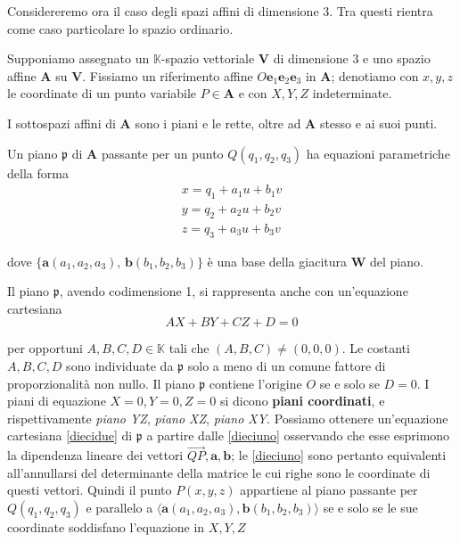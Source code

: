 \documentclass{article}
\theoremstyle{plain}
\theoremstyle{definition}
\theoremstyle{remark}
\begin{document}
Considereremo ora il caso degli spazi affini di dimensione $3$. 
Tra questi rientra come caso particolare lo spazio ordinario.

Supponiamo assegnato un \( \mathbb{K} \)-spazio vettoriale \( \mathbf{V} \) di dimensione $3$ e uno spazio affine \( \mathbf{A} \) su \( \mathbf{V} \). 
Fissiamo un riferimento affine \( O\mathbf{e}_1\mathbf{e}_2\mathbf{e}_3 \) in \( \mathbf{A} \); denotiamo con \( x, y, z \) le coordinate di un punto variabile 
\( P \in \mathbf{A} \) e con \( X, Y, Z \) indeterminate.

I sottospazi affini di \( \mathbf{A} \) sono i piani e le rette, oltre ad \( \mathbf{A} \) stesso e ai suoi punti.

Un piano \( \mathfrak{p} \) di \( \mathbf{A} \) passante per un punto \( Q(q_1, q_2, q_3) \) ha equazioni parametriche della forma
\begin{equation}
\begin{matrix}\label{dieciuno}
x = q_1 + a_1 u + b_1 v \\
y = q_2 + a_2 u + b_2 v \\
z = q_3 + a_3 u + b_3 v
\end{matrix}
\end{equation}

dove \( \{ \mathbf{a}(a_1, a_2, a_3), \, \mathbf{b}(b_1, b_2, b_3) \} \) è una base della giacitura \( \mathbf{W} \) del piano.

Il piano \( \mathfrak{p} \), avendo codimensione 1, si rappresenta anche con un'equazione cartesiana
\begin{equation}\label{diecidue}
AX + BY + CZ + D = 0
\end{equation}

per opportuni \( A, B, C, D \in \mathbb{K} \) tali che \( (A, B, C) \ne (0, 0, 0) \). 
Le costanti \( A, B, C, D \) sono individuate da \( \mathfrak{p} \) solo a meno di un comune fattore di proporzionalità non nullo.
Il piano \( \mathfrak{p} \) contiene l'origine \( O \) se e solo se \( D = 0 \). 
I piani di equazione \( X = 0, Y = 0, Z = 0 \) si dicono \textbf{piani coordinati}, e rispettivamente \textit{piano YZ}, \textit{piano XZ}, \textit{piano XY}.
Possiamo ottenere un'equazione cartesiana \ref{diecidue} di \( \mathfrak{p} \) a partire dalle \ref{dieciuno} osservando che esse esprimono la dipendenza lineare dei 
vettori \( \overrightarrow{QP}, \mathbf{a}, \mathbf{b} \); le \ref{dieciuno} sono pertanto equivalenti all'annullarsi del determinante della matrice le cui righe sono le coordinate di questi vettori. 
Quindi il punto \( P(x, y, z) \) appartiene al piano passante per \( Q(q_1, q_2, q_3) \) e parallelo a \( \langle \mathbf{a}(a_1, a_2, a_3), \mathbf{b}(b_1, b_2, b_3) \rangle \) se e solo se le sue coordinate soddisfano l'equazione in \( X, Y, Z \)
\end{document}
